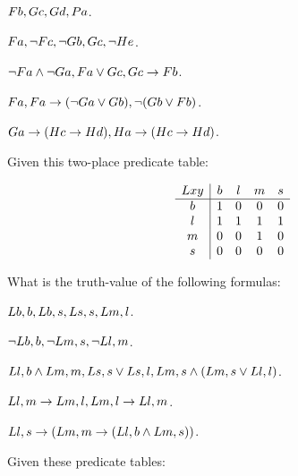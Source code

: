 \documentclass[PHIL101-Textbook.tex]{subfiles}
\begin{document}
\begin{earg}
\item $\mathord{F}{b}, \mathord{G}{c}, \mathord{G}{d}, \mathord{P}{a}$.
  \item $\mathord{F}{a}, \neg \mathord{F}{c}, \neg \mathord{G}{b}, \mathord{G}{c}, \neg \mathord{H}{e}$.
  \item $\neg \mathord{F}{a} \land \neg \mathord{G}{a}, \mathord{F}{a} \vee \mathord{G}{c}, \mathord{G}{c} \rightarrow \mathord{F}{b}$.
  \item $\mathord{F}{a}, \mathord{F}{a}\rightarrow (\neg \mathord{G}{a} \vee \mathord{G}{b}), \neg (\mathord{G}{b} \vee \mathord{F}{b})$.
	\item $\mathord{G}{a} \rightarrow (\mathord{H}{c} \rightarrow \mathord{H}{d}), \mathord{H}{a} \rightarrow (\mathord{H}{c} \rightarrow \mathord{H}{d})$.
\end{earg}


\problempart
\label{pr.relation-tables}

Given this two-place predicate table:


 \[\begin{array}{c|cccc}
	\mathord{L}{x y} & b & l & m & s\\ \hline
	b & 1 & 0 & 0 & 0 \\
	l & 1 & 1 & 1 & 1\\
	m & 0 & 0 & 1 & 0\\
	s & 0 & 0 & 0 & 0	
  \end{array}\]

\noindent What is the truth-value of the following formulas:

\begin{earg}
\item $\mathord{L}{b,b}, \mathord{L}{b,s}, \mathord{L}{s,s}, \mathord{L}{m,l}$.
\item $\neg\mathord{L}{b,b}, \neg\mathord{L}{m,s}, \neg\mathord{L}{l,m}$.
\item $\mathord{L}{l,b}\land \mathord{L}{m,m}, \mathord{L}{s,s} \vee \mathord{L}{s,l}, \mathord{L}{m,s} \land (\mathord{L}{m,s}  \vee \mathord{L}{l,l})$.
\item $\mathord{L}{l,m} \rightarrow \mathord{L}{m,l}, \mathord{L}{m,l} \rightarrow \mathord{L}{l,m}$.
\item $\mathord{L}{l,s} \rightarrow (\mathord{L}{m,m} \rightarrow (\mathord{L}{l,b}\land \mathord{L}{m,s}))$.
\end{earg}

\noindent \problempart
\label{pr.relation-tables-2} Given these predicate tables:
\end{document}
